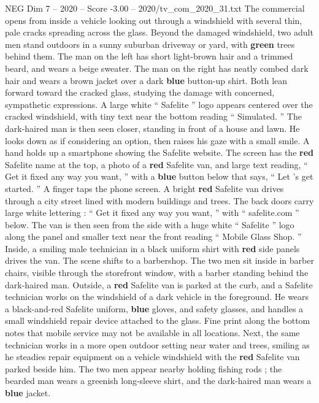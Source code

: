 \begin{textsample}{NEG Dim 7 – 2020 – Score -3.00 – 2020/tv\_com\_2020\_31.txt}  \label{ex:f7_neg_020}
The commercial opens from inside a vehicle looking out through a windshield with several thin, pale cracks spreading across the glass.
Beyond the damaged windshield, two adult men stand outdoors in a sunny suburban driveway or yard, with \textbf{green} trees behind them.
The man on the left has short light-brown hair and a trimmed beard, and wears a beige sweater.
The man on the right has neatly combed dark hair and wears a brown jacket over a dark \textbf{blue} button-up shirt.
Both lean forward toward the cracked glass, studying the damage with concerned, sympathetic expressions.
A large white “ Safelite ” logo appears centered over the cracked windshield, with tiny text near the bottom reading “ Simulated. ” The dark-haired man is then seen closer, standing in front of a house and lawn.
He looks down as if considering an option, then raises his gaze with a small smile.
A hand holds up a smartphone showing the Safelite website.
The screen has the \textbf{red} Safelite name at the top, a photo of a \textbf{red} Safelite van, and large text reading, “ Get it fixed any way you want, ” with a \textbf{blue} button below that says, “ Let ’s get started. ” A finger taps the phone screen.
A bright \textbf{red} Safelite van drives through a city street lined with modern buildings and trees.
The back doors carry large white lettering : “ Get it fixed any way you want, ” with “ safelite.com ” below.
The van is then seen from the side with a huge white “ Safelite ” logo along the panel and smaller text near the front reading “ Mobile Glass Shop. ” Inside, a smiling male technician in a black uniform shirt with \textbf{red} side panels drives the van.
The scene shifts to a barbershop.
The two men sit inside in barber chairs, visible through the storefront window, with a barber standing behind the dark-haired man.
Outside, a \textbf{red} Safelite van is parked at the curb, and a Safelite technician works on the windshield of a dark vehicle in the foreground.
He wears a black-and-red Safelite uniform, \textbf{blue} gloves, and safety glasses, and handles a small windshield repair device attached to the glass.
Fine print along the bottom notes that mobile service may not be available in all locations.
Next, the same technician works in a more open outdoor setting near water and trees, smiling as he steadies repair equipment on a vehicle windshield with the \textbf{red} Safelite van parked beside him.
The two men appear nearby holding fishing rods ; the bearded man wears a greenish long-sleeve shirt, and the dark-haired man wears a \textbf{blue} jacket.

\end{textsample}
